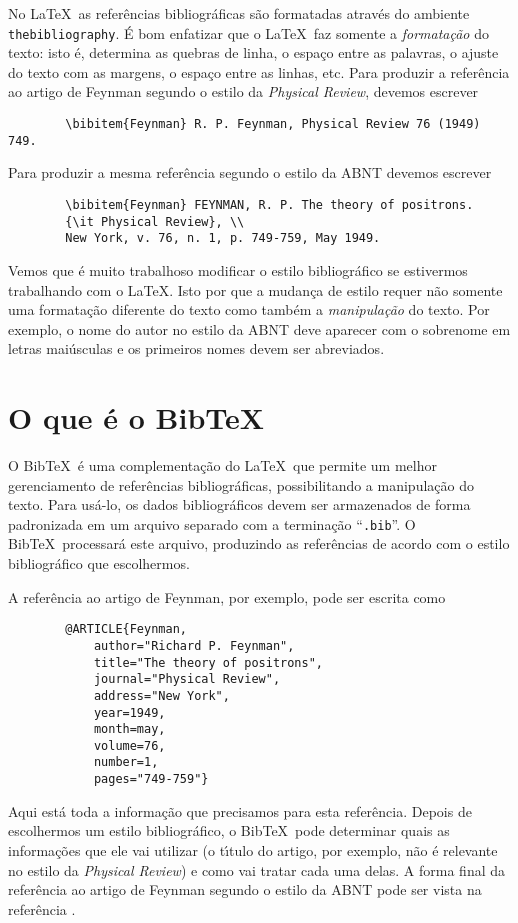 \documentclass[a4paper,12pt]{article}
\newcommand{\ii}{\'{\i}}
\newcommand{\ca}{\c{c}\~ao}
\newcommand{\co}{\c{c}\~oes}
\begin{document}
	
	No \LaTeX\ as refer\^encias bibliogr\'aficas s\~ao formatadas 
	atrav\'es do ambiente \verb+thebibliography+.
	\'E bom enfatizar que o \LaTeX\ faz somente
	a {\it formata{\ca}} do texto: 
	isto \'e, determina as quebras de linha, o espa\c{c}o
	entre as palavras, o ajuste do texto com as margens, o espa\c{c}o 
	entre as linhas, etc. Para produzir a refer\^encia ao artigo
	de Feynman segundo o estilo da {\it Physical Review},
	devemos escrever
	\begin{verbatim}
		\bibitem{Feynman} R. P. Feynman, Physical Review 76 (1949) 749.
	\end{verbatim}
	Para produzir a mesma refer\^encia segundo o estilo da ABNT
	devemos escre\-ver
	\begin{verbatim}
		\bibitem{Feynman} FEYNMAN, R. P. The theory of positrons.
		{\it Physical Review}, \\ 
		New York, v. 76, n. 1, p. 749-759, May 1949.
	\end{verbatim}
	Vemos que \'e muito trabalhoso modificar o estilo bibliogr\'afico
	se estivermos trabalhando com o \LaTeX . Isto por que a mudan\c{c}a
	de estilo requer n\~ao somente uma formata{\ca} diferente do texto
	como tamb\'em a {\it manipula{\ca}} do texto. Por exemplo, o nome
	do autor no estilo da ABNT deve aparecer com o sobrenome em letras
	mai\'usculas e os primeiros nomes devem ser abreviados.
	
	
	
	\section{O que \'e o Bib\TeX\ }
	
	
	
	O Bib\TeX\ \'e uma complementa{\ca} do \LaTeX\ que permite um melhor
	gerenciamento de refer\^encias bibliogr\'aficas, possibilitando
	a manipula{\ca} do texto.
	Para us\'a-lo,
	os dados bibliogr\'aficos devem ser armazenados de forma padro\-ni\-zada
	em um arquivo separado com a termina{\ca} ``\verb+.bib+''.
	O Bib\TeX\ processar\'a este arquivo, produzindo as refer\^encias
	de acordo com o estilo biblio\-gr\'afico que escolhermos.
	
	A refer\^encia ao artigo de Feynman, por exemplo, pode ser escrita como
	\begin{verbatim}
		@ARTICLE{Feynman,
			author="Richard P. Feynman", 
			title="The theory of positrons",
			journal="Physical Review",
			address="New York",
			year=1949,
			month=may,
			volume=76,
			number=1,
			pages="749-759"}
	\end{verbatim}
	Aqui est\'a toda a informa{\ca} que precisamos para esta
	refer\^encia. Depois de escolhermos um estilo bibliogr\'afico,
	o Bib\TeX\ pode determinar quais as informa{\co} que ele
	vai utilizar (o t{\ii}tulo do artigo, por exemplo,  n\~ao \'e
	relevante no estilo da {\it Physical Review}) e como vai tratar
	cada uma delas. A forma final da refer\^encia ao artigo de Feynman
	segundo o estilo da ABNT pode ser vista na refer\^encia 
	\cite{Feynman}.
	
\end{document}
